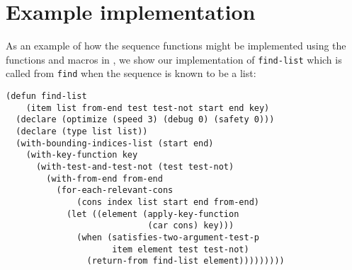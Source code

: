 \section{Example implementation}

As an example of how the sequence functions might be implemented using
the functions and macros in , we show our
implementation of \texttt{find-list} which is called from
\texttt{find} when the sequence is known to be a list:

{\small\begin{verbatim}
(defun find-list
    (item list from-end test test-not start end key)
  (declare (optimize (speed 3) (debug 0) (safety 0)))
  (declare (type list list))
  (with-bounding-indices-list (start end)
    (with-key-function key
      (with-test-and-test-not (test test-not)
        (with-from-end from-end
          (for-each-relevant-cons
              (cons index list start end from-end)
            (let ((element (apply-key-function 
                            (car cons) key)))
              (when (satisfies-two-argument-test-p 
                     item element test test-not)
                (return-from find-list element)))))))))
\end{verbatim}}

